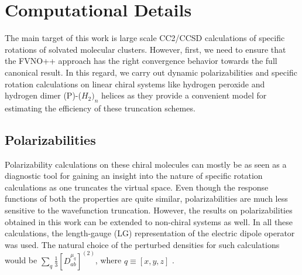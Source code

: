 \section{Computational Details}
The main target of this work is large scale CC2\cite{Christiansen95:CC2}/CCSD calculations of specific 
rotations of solvated molecular clusters. However, first, we need to ensure 
that the FVNO++ approach has the right convergence behavior towards the full
canonical result. In this regard, we carry out dynamic polarizabilities 
and specific rotation calculations on linear chiral systems like 
hydrogen peroxide and hydrogen dimer (P)-($H_2)_n$ helices as they provide a 
convenient model for estimating the efficiency of these truncation schemes. 
\subsection{Polarizabilities}
Polarizability calculations on these chiral molecules can mostly be as seen as a diagnostic 
tool for gaining an insight into the nature of specific rotation calculations as one 
truncates the virtual space. Even though the response functions of both the properties 
are quite similar, polarizabilities are much less sensitive to the 
wavefunction truncation. However, the results on polarizabilities obtained in this work
can be extended to non-chiral systems as well. In all these calculations, the length-gauge 
(LG) representation of the electric dipole operator was used. The natural choice of 
the perturbed densities for such calculations would be $\sum\limits_q \frac{1}{3}[{D^{\mu_q}_{ab}}]^{(2)}$,
where $q \equiv [x,y,z]$ . 
